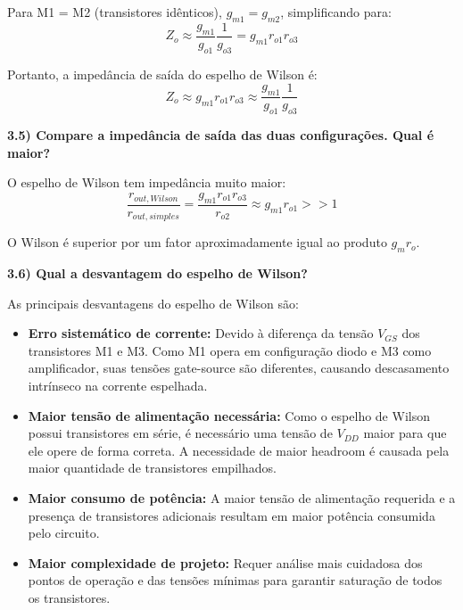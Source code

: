 \documentclass[12pt,a4paper]{article}
\begin{document}
Para M1 = M2 (transistores idênticos), $g_{m1} = g_{m2}$, simplificando para:
\begin{equation*}
Z_o \approx \frac{g_{m1}}{g_{o1}} \frac{1}{g_{o3}} = g_{m1} r_{o1} r_{o3}
\end{equation*}

Portanto, a impedância de saída do espelho de Wilson é:
\begin{equation}
\boxed{Z_o \approx g_{m1} r_{o1} r_{o3} \approx \frac{g_{m1}}{g_{o1}} \frac{1}{g_{o3}}}
\end{equation}

\textbf{3.5) Compare a impedância de saída das duas configurações. Qual é maior?}

O espelho de Wilson tem impedância muito maior:
\begin{equation*}
\frac{r_{out,Wilson}}{r_{out,simples}} = \frac{g_{m1} r_{o1} r_{o3}}{r_{o2}} \approx g_{m1} r_{o1} >> 1
\end{equation*}

O Wilson é superior por um fator aproximadamente igual ao produto $g_m r_o$.

\textbf{3.6) Qual a desvantagem do espelho de Wilson?}

As principais desvantagens do espelho de Wilson são:

\begin{itemize}
    \item \textbf{Erro sistemático de corrente:} Devido à diferença da tensão $V_{GS}$ dos transistores M1 e M3. Como M1 opera em configuração diodo e M3 como amplificador, suas tensões gate-source são diferentes, causando descasamento intrínseco na corrente espelhada.
    
    \item \textbf{Maior tensão de alimentação necessária:} Como o espelho de Wilson possui transistores em série, é necessário uma tensão de $V_{DD}$ maior para que ele opere de forma correta. A necessidade de maior headroom é causada pela maior quantidade de transistores empilhados.
    
    \item \textbf{Maior consumo de potência:} A maior tensão de alimentação requerida e a presença de transistores adicionais resultam em maior potência consumida pelo circuito.
    
    \item \textbf{Maior complexidade de projeto:} Requer análise mais cuidadosa dos pontos de operação e das tensões mínimas para garantir saturação de todos os transistores.
\end{itemize}
\end{document}
